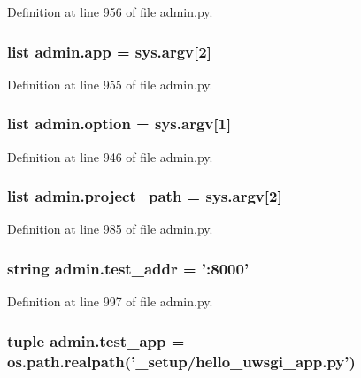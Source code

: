 Definition at line 956 of file admin.\-py.

\hypertarget{namespaceadmin_a88f927a5e67d8ccf759fd256f58a9411}{
\subsubsection[{app}]{\setlength{\rightskip}{0pt plus 5cm}list admin.\-app = sys.\-argv\mbox{[}2\mbox{]}}}\label{namespaceadmin_a88f927a5e67d8ccf759fd256f58a9411}


Definition at line 955 of file admin.\-py.

\hypertarget{namespaceadmin_a5ed72260a120fc91cfd491f424eeb883}{
\subsubsection[{option}]{\setlength{\rightskip}{0pt plus 5cm}list admin.\-option = sys.\-argv\mbox{[}1\mbox{]}}}\label{namespaceadmin_a5ed72260a120fc91cfd491f424eeb883}


Definition at line 946 of file admin.\-py.

\hypertarget{namespaceadmin_a311ce11d8285f485768151b9d757e478}{
\subsubsection[{project\-\_\-path}]{\setlength{\rightskip}{0pt plus 5cm}list admin.\-project\-\_\-path = sys.\-argv\mbox{[}2\mbox{]}}}\label{namespaceadmin_a311ce11d8285f485768151b9d757e478}


Definition at line 985 of file admin.\-py.

\hypertarget{namespaceadmin_a48db396eb86a22a960bba5ce65c12651}{
\subsubsection[{test\-\_\-addr}]{\setlength{\rightskip}{0pt plus 5cm}string admin.\-test\-\_\-addr = '\-:8000'}}\label{namespaceadmin_a48db396eb86a22a960bba5ce65c12651}


Definition at line 997 of file admin.\-py.

\hypertarget{namespaceadmin_a86733f8848ca96c56cf7c51370ebc7bd}{
\subsubsection[{test\-\_\-app}]{\setlength{\rightskip}{0pt plus 5cm}tuple admin.\-test\-\_\-app = os.\-path.\-realpath('{\bf \-\_\-setup}/hello\-\_\-uwsgi\-\_\-app.\-py')}}\label{namespaceadmin_a86733f8848ca96c56cf7c51370ebc7bd}



